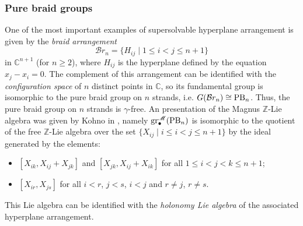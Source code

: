 \documentclass{amsart}
\theoremstyle{plain}
\theoremstyle{definition}
\numberwithin{theorem}{section}
\numberwithin{equation}{section}
\newcommand{\grM}{\operatorname{gr}^{\mathscr M}}
\newcommand{\Z}{\mathbb Z}
\begin{document}
\subsubsection{Pure braid groups}
One of the most important examples of supersolvable hyperplane arrangement is given by the \emph{braid arrangement} \[
    \mathcal Br_n = \{ H_{ij} \mid 1 \leq i < j \leq n+1\}
\]
in $\mathbb C^{n+1}$ (for $n \geq 2$), where $H_{ij}$ is the hyperplane defined by the equation $x_j - x_i = 0$. The complement of this arrangement can be identified with the \emph{configuration space} of $n$ distinct points in $\mathbb C$, so its fundamental group
is isomorphic to the pure braid group on $n$ strands, i.e. $G(\mathcal Br_n) \cong {\rm PB}_n$. Thus, the pure braid group on $n$ strands is $\gamma$-free. An presentation of the Magnus $\Z$-Lie algebra was given by Kohno in \cite{Koh85}, namely $\grM_\bullet({\rm PB}_n)$ is isomorphic to the quotient of the free $\Z$-Lie algebra over the set $\{X_{ij} \mid i \leq i < j \leq n+1\}$ by the ideal generated by the elements:
\begin{itemize}
    \item $[X_{ik}, X_{ij}+X_{jk}]$ and $[X_{jk}, X_{ij}+X_{ik}]$ for all $1 \leq i < j < k \leq n+1$;
    \item $[X_{ir}, X_{js}]$ for all $i < r$, $j < s$, $i < j$ and $r \neq j$, $r \neq s$.
\end{itemize}
This Lie algebra can be identified with the \emph{holonomy Lie algebra} of the associated hyperplane arrangement.
\end{document}
